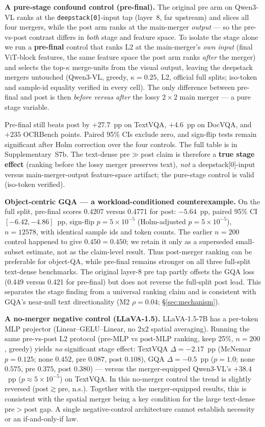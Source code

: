 \documentclass[sigconf,nonacm]{acmart}
\begin{document}
\textbf{A pure-stage confound control (pre-final).} The original pre arm on
Qwen3-VL ranks at the \texttt{deepstack[0]}-input tap (layer~8, far upstream)
and slices all four mergers, while the post arm ranks at the main-merger
\emph{output} --- so the pre-vs-post contrast differs in \emph{both} stage and
feature space. To isolate the stage alone we run a \textbf{pre-final} control
that ranks L2 at the main-merger's \emph{own input} (final ViT-block features,
the same feature space the post arm ranks \emph{after} the merger) and selects
the top-$\kappa$ merge-units from the visual output, leaving the deepstack
mergers untouched (Qwen3-VL, greedy, $\kappa = 0.25$, L2, official full
  splits; iso-token and sample-id equality verified in every cell). The only
difference between pre-final and post is then \emph{before versus after} the
lossy $2\!\times\!2$ main merger --- a pure stage variable.

Pre-final still beats post by $+27.7$~pp on TextVQA, $+4.6$~pp on DocVQA, and
$+235$ OCRBench points. Paired 95\% CIs exclude zero, and sign-flip tests remain
significant after Holm correction over the four controls. The full table is
in Supplementary~S7b. The text-dense
pre$\gg$post claim is therefore a \textbf{true stage effect} (ranking before
the lossy merger preserves text), \emph{not} a deepstack[0]-input versus
main-merger-output feature-space artifact; the pure-stage control is valid
(iso-token verified).

\textbf{Object-centric GQA --- a workload-conditioned counterexample.} On the
full split, pre-final scores 0.4207 versus 0.4771 for post: $-5.64$~pp, paired
95\% CI $[-6.42,-4.86]$~pp, sign-flip $p=5\times10^{-5}$ (Holm-adjusted
$p=5\times10^{-5}$), $n=12578$, with identical sample ids and token counts.
The earlier $n=200$ control happened to give $0.450=0.450$; we retain it only
as a superseded small-subset estimate, not as the claim-level result. Thus
post-merger ranking can be preferable for object-QA, while pre-final remains
stronger on all three full-split text-dense benchmarks. The original layer-8
pre tap partly offsets the GQA loss (0.449 versus 0.421 for pre-final) but does
not reverse the full-split post lead. This separates the stage finding from a
universal ranking claim and is consistent with GQA's near-null text
directionality (M2 $\rho=0.04$; \S\ref{sec:mechanism}).

\textbf{A no-merger negative control (LLaVA-1.5).} LLaVA-1.5-7B has a per-token MLP projector
(Linear--GELU--Linear, no 2x2 spatial averaging). Running the same pre-vs-post
L2 protocol (pre-MLP vs post-MLP ranking, keep 25\%, $n{=}200$, greedy) yields
\emph{no} significant stage effect: TextVQA $\Delta = -2.17$~pp (McNemar
$p{=}0.125$; none $0.452$, pre $0.087$, post $0.108$), GQA $\Delta = -0.5$~pp
($p{=}1.0$; none $0.575$, pre $0.375$, post $0.380$) --- versus the
merger-equipped Qwen3-VL's $+38.4$~pp ($p{\approx}5{\times}10^{-5}$) on TextVQA.
In this no-merger control the trend is slightly reversed
(post$\gtrsim$pre, n.s.). Together with the merger-equipped results, this is
consistent with the spatial merger being a key condition for the large
text-dense pre$>$post gap. A single negative-control architecture cannot
establish necessity or an if-and-only-if law.
\end{document}
